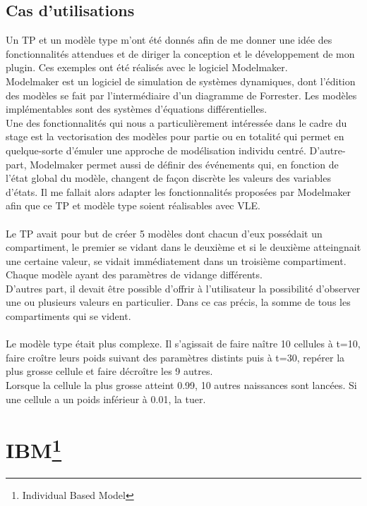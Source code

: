\subsection{Cas d'utilisations}
Un TP et un modèle type m'ont été donnés afin de me donner une idée des fonctionnalités attendues et de diriger la conception et le développement de mon plugin. Ces exemples ont été réalisés avec le logiciel Modelmaker.\\
Modelmaker est un logiciel de simulation de systèmes dynamiques, dont l'édition des modèles se fait par l'intermédiaire d'un diagramme de Forrester. Les modèles implémentables sont des systèmes d'équations différentielles.\\
Une des fonctionnalités qui nous a particulièrement intéressée dans le cadre du stage est la vectorisation des modèles pour partie ou en totalité qui permet en quelque-sorte d'émuler une approche de modélisation individu centré. D'autre-part, Modelmaker permet aussi de définir des événements qui, en fonction de l'état global du modèle, changent de façon discrète les valeurs des variables d'états. Il me fallait alors adapter les fonctionnalités proposées par Modelmaker afin que ce TP et modèle type soient réalisables avec VLE.\\
\\
Le TP avait pour but de créer 5 modèles dont chacun d'eux possédait un compartiment, le premier se vidant dans le deuxième et si le deuxième atteingnait une certaine valeur, se vidait immédiatement dans un troisième compartiment. Chaque modèle ayant des paramètres de vidange différents.\\
D'autres part, il devait être possible d'offrir à l'utilisateur la possibilité d'observer une ou plusieurs valeurs en particulier. Dans ce cas précis, la somme de tous les compartiments qui se vident.\\
\\
Le modèle type était plus complexe. Il s'agissait de faire naître 10 cellules à t=10, faire croître leurs poids suivant des paramètres distints puis à t=30, repérer la plus grosse cellule et faire décroître les 9 autres.\\ Lorsque la cellule la plus grosse atteint 0.99, 10 autres naissances sont lancées. Si une cellule a un poids inférieur à 0.01, la tuer.
 
\section[IBM] {IBM\footnote{Individual Based Model}}
